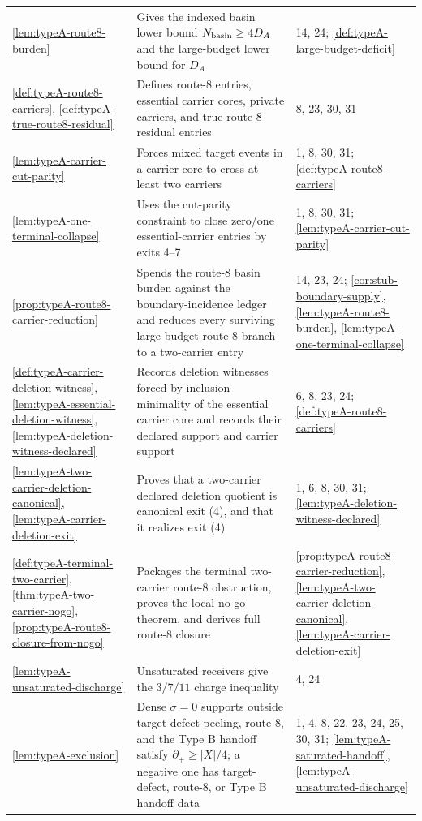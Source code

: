 \documentclass[11pt]{article}
\newcommand{\defp}{\partial_+}
\begin{document}
{\begin{longtable}{L{0.31\textwidth} L{0.42\textwidth} L{0.17\textwidth}}
\cref{lem:typeA-route8-burden} & Gives the indexed basin lower bound \(N_{\rm basin}\ge4D_A\) and the large-budget lower bound for \(D_A\) & 14, 24; \cref{def:typeA-large-budget-deficit} \\
\cref{def:typeA-route8-carriers}, \cref{def:typeA-true-route8-residual} & Defines route-8 entries, essential carrier cores, private carriers, and true route-8 residual entries & 8, 23, 30, 31 \\
\cref{lem:typeA-carrier-cut-parity} & Forces mixed target events in a carrier core to cross at least two carriers & 1, 8, 30, 31; \cref{def:typeA-route8-carriers} \\
\cref{lem:typeA-one-terminal-collapse} & Uses the cut-parity constraint to close zero/one essential-carrier entries by exits 4--7 & 1, 8, 30, 31; \cref{lem:typeA-carrier-cut-parity} \\
\cref{prop:typeA-route8-carrier-reduction} & Spends the route-8 basin burden against the boundary-incidence ledger and reduces every surviving large-budget route-8 branch to a two-carrier entry & 14, 23, 24; \cref{cor:stub-boundary-supply}, \cref{lem:typeA-route8-burden}, \cref{lem:typeA-one-terminal-collapse} \\
\cref{def:typeA-carrier-deletion-witness}, \cref{lem:typeA-essential-deletion-witness}, \cref{lem:typeA-deletion-witness-declared} & Records deletion witnesses forced by inclusion-minimality of the essential carrier core and records their declared support and carrier support & 6, 8, 23, 24; \cref{def:typeA-route8-carriers} \\
\cref{lem:typeA-two-carrier-deletion-canonical}, \cref{lem:typeA-carrier-deletion-exit} & Proves that a two-carrier declared deletion quotient is canonical exit (4), and that it realizes exit (4) & 1, 6, 8, 30, 31; \cref{lem:typeA-deletion-witness-declared} \\
\cref{def:typeA-terminal-two-carrier}, \cref{thm:typeA-two-carrier-nogo}, \cref{prop:typeA-route8-closure-from-nogo} & Packages the terminal two-carrier route-8 obstruction, proves the local no-go theorem, and derives full route-8 closure & \cref{prop:typeA-route8-carrier-reduction}, \cref{lem:typeA-two-carrier-deletion-canonical}, \cref{lem:typeA-carrier-deletion-exit} \\
\cref{lem:typeA-unsaturated-discharge} & Unsaturated receivers give the $3/7/11$ charge inequality & 4, 24 \\
\cref{lem:typeA-exclusion} & Dense $\sigma=0$ supports outside target-defect peeling, route 8, and the Type B handoff satisfy $\defp\ge|X|/4$; a negative one has target-defect, route-8, or Type B handoff data & 1, 4, 8, 22, 23, 24, 25, 30, 31; \cref{lem:typeA-saturated-handoff}, \cref{lem:typeA-unsaturated-discharge} \\

\end{longtable}}
\end{document}
